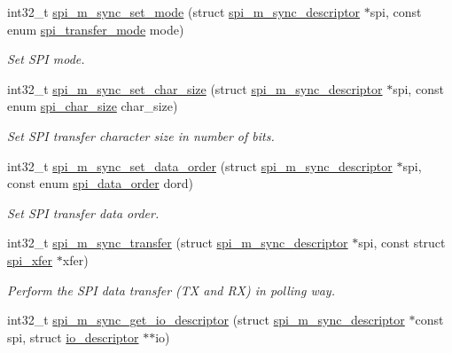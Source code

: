 \begin{DoxyCompactItemize}
int32\+\_\+t \hyperlink{group__doc__driver__hal__spi__master__sync_gae0189af85236848e651205053e332521}{spi\+\_\+m\+\_\+sync\+\_\+set\+\_\+mode} (struct \hyperlink{structspi__m__sync__descriptor}{spi\+\_\+m\+\_\+sync\+\_\+descriptor} $\ast$spi, const enum \hyperlink{group__hpl__spi_ga9c30fdfffba6be76b4044ccb17b218e5}{spi\+\_\+transfer\+\_\+mode} mode)
\begin{DoxyCompactList}\small\item\em Set S\+PI mode. \end{DoxyCompactList}\item 
int32\+\_\+t \hyperlink{group__doc__driver__hal__spi__master__sync_ga92c45dae92165462bb938bd9df4ab94c}{spi\+\_\+m\+\_\+sync\+\_\+set\+\_\+char\+\_\+size} (struct \hyperlink{structspi__m__sync__descriptor}{spi\+\_\+m\+\_\+sync\+\_\+descriptor} $\ast$spi, const enum \hyperlink{group__hpl__spi_ga4a3ef460c2cea333834811806f32d60a}{spi\+\_\+char\+\_\+size} char\+\_\+size)
\begin{DoxyCompactList}\small\item\em Set S\+PI transfer character size in number of bits. \end{DoxyCompactList}\item 
int32\+\_\+t \hyperlink{group__doc__driver__hal__spi__master__sync_ga8b36184685ef17e6ffd0f1df3f0ea5be}{spi\+\_\+m\+\_\+sync\+\_\+set\+\_\+data\+\_\+order} (struct \hyperlink{structspi__m__sync__descriptor}{spi\+\_\+m\+\_\+sync\+\_\+descriptor} $\ast$spi, const enum \hyperlink{group__hpl__spi_gabaa69dbc0601cb5b1e2681400598a4b2}{spi\+\_\+data\+\_\+order} dord)
\begin{DoxyCompactList}\small\item\em Set S\+PI transfer data order. \end{DoxyCompactList}\item 
int32\+\_\+t \hyperlink{group__doc__driver__hal__spi__master__sync_gae4bc019de8bd861b7bbb75f5a83e6261}{spi\+\_\+m\+\_\+sync\+\_\+transfer} (struct \hyperlink{structspi__m__sync__descriptor}{spi\+\_\+m\+\_\+sync\+\_\+descriptor} $\ast$spi, const struct \hyperlink{structspi__xfer}{spi\+\_\+xfer} $\ast$xfer)
\begin{DoxyCompactList}\small\item\em Perform the S\+PI data transfer (TX and RX) in polling way. \end{DoxyCompactList}\item 
int32\+\_\+t \hyperlink{group__doc__driver__hal__spi__master__sync_ga658f37bdda03b932a3400c5bb2abccff}{spi\+\_\+m\+\_\+sync\+\_\+get\+\_\+io\+\_\+descriptor} (struct \hyperlink{structspi__m__sync__descriptor}{spi\+\_\+m\+\_\+sync\+\_\+descriptor} $\ast$const spi, struct \hyperlink{structio__descriptor}{io\+\_\+descriptor} $\ast$$\ast$io)
$$
\end{DoxyCompactItemize}
